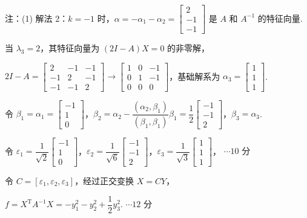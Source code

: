 \documentclass[a4paper,11pt]{ctexart}
\newcommand{\T}{\mathrm{T}}
\newcommand{\score}[1]{\hfill$\cdots\text{#1 分}$}
\begin{document}
\begin{enumerate}[label=(\arabic*), leftmargin=2.4em, itemsep=0.4em, topsep=0.3em]
  注：(1) 解法 2：$k = -1$ 时，$\alpha = -\alpha_1 - \alpha_2 = \begin{bmatrix} 2 \\ -1 \\ -1 \end{bmatrix}$ 是 $A$ 和 $A^{-1}$ 的特征向量.

  当 $\lambda_3 = 2$，其特征向量为 $(2I - A)X = 0$ 的非零解，

  $2I - A = \begin{bmatrix} 2 & -1 & -1 \\ -1 & 2 & -1 \\ -1 & -1 & 2 \end{bmatrix} \to \begin{bmatrix} 1 & 0 & -1 \\ 0 & 1 & -1 \\ 0 & 0 & 0 \end{bmatrix}$，基础解系为 $\alpha_3 = \begin{bmatrix} 1 \\ 1 \\ 1 \end{bmatrix}$.

  令 $\beta_1 = \alpha_1 = \begin{bmatrix} -1 \\ 1 \\ 0 \end{bmatrix}$，$\beta_2 = \alpha_2 - \dfrac{(\alpha_2, \beta_1)}{(\beta_1, \beta_1)}\beta_1 = \dfrac{1}{2}\begin{bmatrix} -1 \\ -1 \\ 2 \end{bmatrix}$，$\beta_3 = \alpha_3$.

  令 $\varepsilon_1 = \dfrac{1}{\sqrt{2}}\begin{bmatrix} -1 \\ 1 \\ 0 \end{bmatrix}$，$\varepsilon_2 = \dfrac{1}{\sqrt{6}}\begin{bmatrix} -1 \\ -1 \\ 2 \end{bmatrix}$，$\varepsilon_3 = \dfrac{1}{\sqrt{3}}\begin{bmatrix} 1 \\ 1 \\ 1 \end{bmatrix}$， \score{10}

  令 $C = [\varepsilon_1, \varepsilon_2, \varepsilon_3]$，经过正交变换 $X = CY$，

  $f = X^{\T} A^{-1} X = -y_1^2 - y_2^2 + \dfrac{1}{2}y_3^2$. \score{12}
\end{enumerate}
\end{document}
